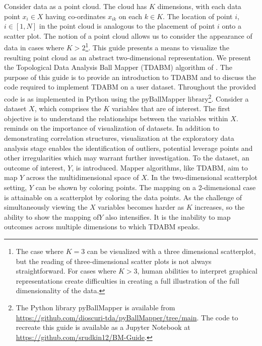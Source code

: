 \documentclass{article}
\begin{document}
Consider data as a point cloud. The cloud has $K$ dimensions, with each data point $x_i \in X$ having co-ordinates $x_{ik}$ on each $k \in K$. The location of point $i$, $i \in [1,N]$ in the point cloud is analogous to the placement of point $i$ onto a scatter plot. The notion of a point cloud allows us to consider the appearance of data in cases where $K>2$\footnote{The case where $K=3$ can be visualized with a three dimensional scatterplot, but the reading of three-dimensional scatter plots is not always straightforward. For cases where $K>3$, human abilities to interpret graphical representations create difficulties in creating a full illustration of the full dimensionality of the data.}. This guide presents a means to visualize the resulting point cloud as an abstract two-dimensional representation. We present the Topological Data Analysis Ball Mapper (TDABM) algorithm of \cite{dlotko2019ball}. The purpose of this guide is to provide an introduction to TDABM and to discuss the code required to implement TDABM on a user dataset. Throughout the provided code is as implemented in Python using the pyBallMapper library\footnote{The Python library pyBallMapper is available from \href{https://github.com/dioscuri-tda/pyBallMapper/tree/main}{https://github.com/dioscuri-tda/pyBallMapper/tree/main}. The code to recreate this guide is available as a Jupyter Notebook at \href{https://github.com/srudkin12/BM-Guide}{https://github.com/srudkin12/BM-Guide}.}. 
Consider a dataset $X$, which comprises the $K$ variables that are of interest. The first objective is to understand the relationships between the variables within $X$. \cite{matejka2017same} reminds on the importance of visualization of datasets. In addition to demonstrating correlation structures, visualization at the exploratory data analysis stage enables the identification of outliers, potential leverage points and other irregularities which may warrant further investigation. To the dataset, an outcome of interest, $Y$, is introduced. Mapper algorithms, like TDABM, aim to map $Y$ across the multidimensional space of $X$. In the two-dimensional scatterplot setting, $Y$ can be shown by coloring points. The mapping on a 2-dimensional case is attainable on a scatterplot by coloring the data points. As the challenge of simultaneously viewing the $X$ variables becomes harder as $K$ increases, so the ability to show the mapping of$Y$ also intensifies. It is the inability to map outcomes across multiple dimensions to which TDABM speaks.
\end{document}
